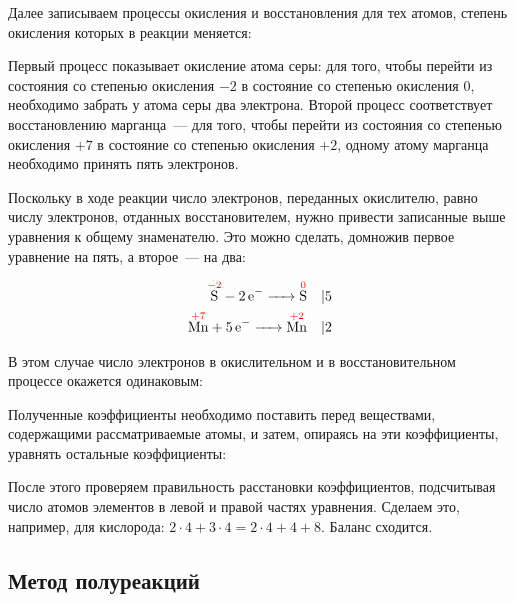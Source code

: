 Далее записываем процессы окисления и восстановления для тех атомов, степень окисления которых в реакции меняется:


Первый процесс показывает окисление атома серы: для того, чтобы перейти из состояния со степенью окисления $-2$ в состояние со степенью окисления 0, необходимо забрать у атома серы два электрона. Второй процесс соответствует восстановлению марганца~--- для того, чтобы перейти из состояния со степенью окисления $+7$ в состояние со степенью окисления $+2$, одному атому марганца необходимо принять пять электронов.

Поскольку в ходе реакции число электронов, переданных окислителю, равно числу электронов, отданных восстановителем, нужно привести записанные выше уравнения к общему знаменателю. Это можно сделать, домножив первое уравнение на пять, а второе~--- на два:

\begin{align*}
    \overset{\textcolor{red}{-2}}{\ce{S}} - \ce{2e- ->} \overset{\textcolor{red}{0}}{\ce{S}} \quad &| 5 \\
    \overset{\textcolor{red}{+7}}{\ce{Mn}} + \ce{5e- ->} \overset{\textcolor{red}{+2}}{\ce{Mn}} \quad &| 2
\end{align*}

В этом случае число электронов в окислительном и в восстановительном процессе окажется одинаковым:


Полученные коэффициенты необходимо поставить перед веществами, содержащими рассматриваемые атомы, и затем, опираясь на эти коэффициенты, уравнять остальные коэффициенты:


После этого проверяем правильность расстановки коэффициентов, подсчитывая число атомов элементов в левой и правой частях уравнения. Сделаем это, например, для кислорода: $2 \cdot 4 + 3 \cdot 4 = 2 \cdot 4 + 4 + 8$. Баланс сходится.

\subsection*{Метод полуреакций}

